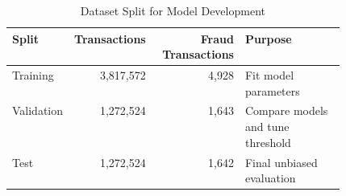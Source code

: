 \begin{table}[H]
\centering
\caption{Dataset Split for Model Development}
\label{tab:dataset_split}
\begin{tabular}{>{\raggedright\arraybackslash}p{0.18\linewidth} r r >{\raggedright\arraybackslash}p{0.30\linewidth}}
\hline
\textbf{Split} & \textbf{Transactions} & \textbf{Fraud Transactions} & \textbf{Purpose} \\
\hline
Training & 3,817,572 & 4,928 & Fit model parameters \\
Validation & 1,272,524 & 1,643 & Compare models and tune threshold \\
Test & 1,272,524 & 1,642 & Final unbiased evaluation \\
\hline
\end{tabular}
\end{table}